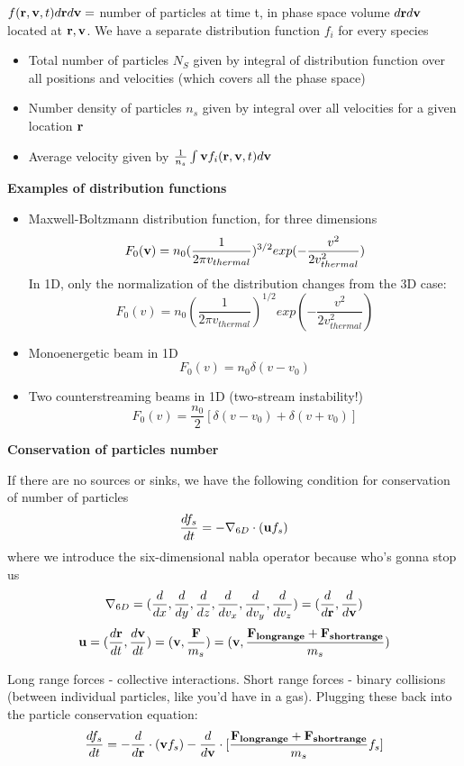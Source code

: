 $f(\mathbf{r}, \mathbf{v}, t) d\mathbf{r} d\mathbf{v} = $ number of particles at time t, in phase space volume $d\mathbf{r} d\mathbf{v}$ located at $\mathbf{r}, \mathbf{v}$. We have a separate distribution function $f_i$ for every species
\begin{itemize}
\item Total number of particles $N_S$ given by integral of distribution function over all positions and velocities (which covers all the phase space)
\item Number density of particles $n_s$ given by integral over all velocities for a given location $\mathbf{r}$ 
\item Average velocity given by $\frac{1}{n_s} \int \mathbf{v} f_i(\mathbf{r}, \mathbf{v}, t)  d\mathbf{v}$
\end{itemize}
\par \textbf{Examples of distribution functions}
\begin{itemize}
	\item Maxwell-Boltzmann distribution function, for three dimensions
	\[ F_0(\mathbf{v}) = n_0 (\frac{1}{2 \pi v_{thermal}})^{3/2} exp(-\frac{v^2}{2 v_{thermal}^2}) \] %
	In 1D, only the normalization of the distribution changes from the 3D case:
	\[ F_0(v) = n_0 (\frac{1}{2 \pi v_{thermal}})^{1/2} exp(-\frac{v^2}{2 v_{thermal}^2}) \]
	\item Monoenergetic beam in 1D
	\[ F_0(v) = n_0 \delta (v-v_0) \]
	\item Two counterstreaming beams in 1D (two-stream instability!)
	\[ F_0(v) = \frac{n_0}{2} [\delta (v-v_0) + \delta(v+v_0)] \]
\end{itemize}

\textbf{Conservation of particles number}

If there are no sources or sinks, we have the following condition for conservation of number of particles
\[ \frac{d f_s}{d t} = -\nabla_{6D} \cdot (\mathbf{u} f_s) \]
where we introduce the six-dimensional nabla operator because who's gonna stop us
\[ \nabla_{6D} = ( \frac{d }{d x},\frac{d }{d y},\frac{d }{d z},\frac{d }{d v_x},\frac{d }{d v_y},\frac{d }{d v_z}) = (\frac{d }{d \mathbf{r}}, \frac{d }{d \mathbf{v}}) \]
\[ \mathbf{u} = (\frac{d \mathbf{r}}{d t}, \frac{d \mathbf{v}}{d t}) = (\mathbf{v}, \frac{\mathbf{F}}{m_s}) = (\mathbf{v}, \frac{\mathbf{F_{long range}} + \mathbf{F_{short range}}}{m_s}) \] %

Long range forces - collective interactions. Short range forces - binary collisions (between individual particles, like you'd have in a gas).
Plugging these back into the particle conservation equation:
\[ \frac{d f_s}{d t} = -\frac{d }{d \mathbf{r}} \cdot (\mathbf{v} f_s) - \frac{d }{d \mathbf{v}} \cdot [\frac{\mathbf{F_{long range}} + \mathbf{F_{short range}}}{m_s} f_s] \]


